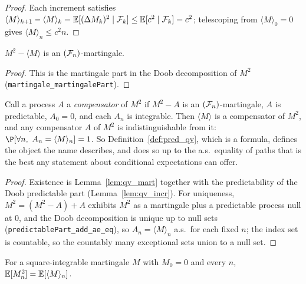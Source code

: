 \begin{proof}\leanok
Each increment satisfies $\langle M\rangle_{k+1}-\langle M\rangle_k
= \mathbb{E}[(\Delta M_k)^2\mid\mathcal{F}_k] \le \mathbb{E}[c^2\mid\mathcal{F}_k] = c^2$; telescoping from
$\langle M\rangle_0 = 0$ gives $\langle M\rangle_n \le c^2 n$.
\end{proof}

\begin{lemma}\label{lem:qv_mart}
\leanok
{}
$M^2 - \langle M\rangle$ is an $(\mathcal{F}_n)$-martingale.
\end{lemma}

\begin{proof}\leanok
This is the martingale part in the Doob decomposition of $M^2$
(\texttt{martingale\_martingalePart}).
\end{proof}

\begin{lemma}\label{lem:qv_unique}
\leanok
{}
Call a process $A$ a \emph{compensator} of $M^2$ if $M^2 - A$ is an $(\mathcal{F}_n)$-martingale, $A$ is
predictable, $A_0 = 0$, and each $A_n$ is integrable. Then $\langle M\rangle$ is a compensator of
$M^2$, and any compensator $A$ of $M^2$ is indistinguishable from it:
$\P[\forall n,\ A_n = \langle M\rangle_n] = 1$. So Definition~\ref{def:pred_qv}, which is a
formula, defines the object the name describes, and does so up to the a.s.\ equality of paths that
is the best any statement about conditional expectations can offer.
\end{lemma}

\begin{proof}\leanok
{}
Existence is Lemma~\ref{lem:qv_mart} together with the predictability of the Doob predictable part
(Lemma~\ref{lem:qv_incr}). For uniqueness, $M^2 = (M^2 - A) + A$ exhibits $M^2$ as a martingale
plus a predictable process null at $0$, and the Doob decomposition is unique up to null sets
(\texttt{predictablePart\_add\_ae\_eq}), so $A_n = \langle M\rangle_n$ a.s.\ for each fixed $n$;
the index set is countable, so the countably many exceptional sets union to a null set.
\end{proof}

\begin{lemma}\label{lem:qv_second_moment}
\leanok
{}
For a square-integrable martingale $M$ with $M_0 = 0$ and every $n$,
$\mathbb{E}[M_n^2] = \mathbb{E}[\langle M\rangle_n]$.
\end{lemma}

